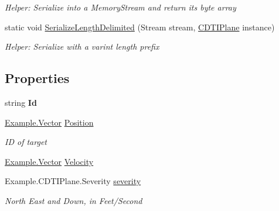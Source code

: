 \begin{DoxyCompactItemize}
\begin{DoxyCompactList}\small\item\em Helper\+: Serialize into a Memory\+Stream and return its byte array\end{DoxyCompactList}\item 
static void \hyperlink{class_example_1_1_c_d_t_i_plane_a861c8211cc2b5f3bcaf3721dff13435c}{Serialize\+Length\+Delimited} (Stream stream, \hyperlink{class_example_1_1_c_d_t_i_plane}{C\+D\+T\+I\+Plane} instance)
\begin{DoxyCompactList}\small\item\em Helper\+: Serialize with a varint length prefix\end{DoxyCompactList}\end{DoxyCompactItemize}
\subsection*{Properties}
\begin{DoxyCompactItemize}
\item 
\hypertarget{class_example_1_1_c_d_t_i_plane_a53b77a1ee0179b238db4357a3f63f9b3}{}string {\bfseries Id}\label{class_example_1_1_c_d_t_i_plane_a53b77a1ee0179b238db4357a3f63f9b3}

\item 
\hyperlink{class_example_1_1_vector}{Example.\+Vector} \hyperlink{class_example_1_1_c_d_t_i_plane_aa002a2dd17256ecf744d9d71d2208a34}{Position}
\begin{DoxyCompactList}\small\item\em I\+D of target\end{DoxyCompactList}\item 
\hyperlink{class_example_1_1_vector}{Example.\+Vector} \hyperlink{class_example_1_1_c_d_t_i_plane_ac20719084518e459b372465f3d862772}{Velocity}
\item 
Example.\+C\+D\+T\+I\+Plane.\+Severity \hyperlink{class_example_1_1_c_d_t_i_plane_aae17457201291626b52f20aac736a9b2}{severity}
\begin{DoxyCompactList}\small\item\em North East and Down, in Feet/\+Second\end{DoxyCompactList}\end{DoxyCompactItemize}


